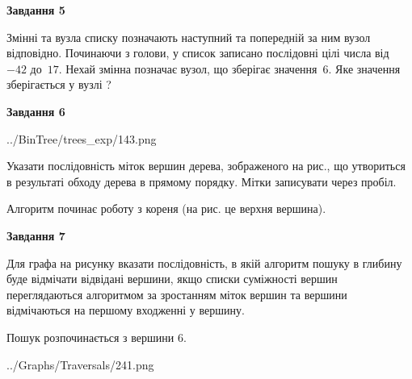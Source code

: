 \documentclass[12pt, ukrainian]{article}
\begin{document}
{\begin {large}
{\begin {center}\textbf{Завдання 5}\end {center}}\par
Змінні  та  вузла списку позначають наступний та попередній за ним вузол відповідно. Починаючи з голови, у список записано послідовні цілі числа від~$-42$ до~$17$. Нехай змінна  позначає вузол, що зберігає значення~$6$.
Яке значення зберігається у вузлі  ?\par
\newpage

{\begin {center}\textbf{Завдання 6}\end {center}}\par

\begin{center}
	{../BinTree/trees_exp/143.png}
\end{center}
Указати послідовність міток вершин дерева, зображеного на рис., що утвориться в результаті обходу дерева в прямому порядку. Мітки записувати через пробіл.\par Алгоритм починає роботу з кореня (на рис. це верхня вершина).\par
\newpage

{\begin {center}\textbf{Завдання 7}\end {center}}\par
Для графа на рисунку вказати послідовність, в якій алгоритм пошуку в глибину буде відмічати відвідані вершини, якщо списки суміжності вершин переглядаються алгоритмом за зростанням міток вершин та вершини відмічаються на першому вход\-женні у вершину.\par
Пошук розпочинається з вершини 6.\par

\begin{center}
	{../Graphs/Traversals/241.png}
\end{center}\par
\newpage


\end{large}}
\end{document}
